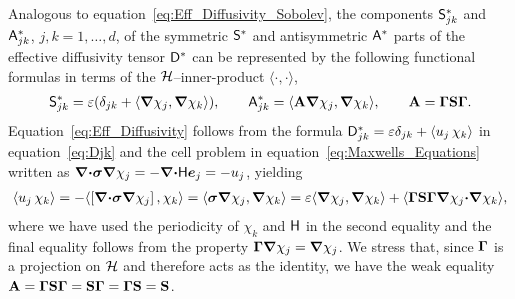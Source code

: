 \documentclass[amsa]{ipart}
\begin{document}
Analogous to equation~\eqref{eq:Eff_Diffusivity_Sobolev}, the
components $\mathsf{S}^*_{jk}$ and $\mathsf{A}^*_{jk}$, $j,k=1,\ldots,d$, of the
symmetric $\mathsf{S}^*$ and antisymmetric $\mathsf{A}^*$ parts of the effective
diffusivity tensor $\mathsf{D}^*$ can be represented by the following
functional formulas in terms of the $\mathcal{H}$--inner-product $\langle\cdot,\cdot\rangle$,
%
\begin{align}\label{eq:Eff_Diffusivity}
 \Sm^*_{jk}=\varepsilon(\delta_{jk}+\langle\bnabla \chi_j,\bnabla \chi_k\rangle), 
  \qquad
 \Am^*_{jk}=\langle\Ab\bnabla \chi_j,\bnabla \chi_k\rangle, 
  \qquad
 \Ab=\bGamma\Sb\bGamma.
\end{align}
%
Equation~\eqref{eq:Eff_Diffusivity} follows from the formula
$\mathsf{D}^*_{jk}=\varepsilon\delta_{jk}+\langle u_j\,\chi_k\rangle$ in equation~\eqref{eq:Djk} and the
cell problem in equation~\eqref{eq:Maxwells_Equations} written as
$\mbox{\boldmath${\nabla}$}\mbox{\boldmath${\cdot}$}\mbox{\boldmath${\sigma}$}\mbox{\boldmath${\nabla}$}\chi_j=-\mbox{\boldmath${\nabla}$}\mbox{\boldmath${\cdot}$}\mathsf{H}\boldsymbol{e}_j=-u_j$, yielding 
%
\begin{align}\label{eq:Functional_Rep}
  \langle u_j\,\chi_k\rangle=-\langle[\bnabla\bcdot\bsig\bnabla\chi_j]\,,\chi_k\rangle
       =\langle\bsig\bnabla\chi_j,\bnabla\chi_k\rangle      
       =\varepsilon\langle\bnabla\chi_j,\bnabla\chi_k\rangle
         +\langle\bGamma\Sb\bGamma\bnabla\chi_j\bcdot\bnabla\chi_k\rangle,       
\end{align}
%
where we have used the periodicity of $\chi_k$ and $\mathsf{H}$ in the second
equality and the final equality follows from the property
$\mbox{\boldmath${\Gamma}$}\mbox{\boldmath${\nabla}$}\chi_j=\mbox{\boldmath${\nabla}$}\chi_j$. We stress that, since $\mbox{\boldmath${\Gamma}$}$ is a
projection on $\mathcal{H}$ and therefore acts as the identity, we have the
weak equality $\mathbf{A}=\mbox{\boldmath${\Gamma}$}\mathbf{S}\mbox{\boldmath${\Gamma}$}=\mathbf{S}\mbox{\boldmath${\Gamma}$}=\mbox{\boldmath${\Gamma}$}\mathbf{S}=\mathbf{S}$.
\end{document}
